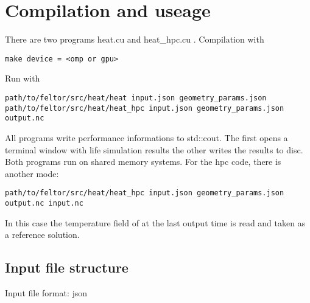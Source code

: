\section{Compilation and useage}
There are two programs heat.cu and heat\_hpc.cu . Compilation with
\begin{verbatim}
make device = <omp or gpu>
\end{verbatim}
Run with
\begin{verbatim}
path/to/feltor/src/heat/heat input.json geometry_params.json
path/to/feltor/src/heat/heat_hpc input.json geometry_params.json output.nc
\end{verbatim}
All programs write performance informations to std::cout.
The first opens a terminal window with life simulation results
the
other writes the results to disc. Both programs run on shared memory
systems.
For the hpc code, there is another mode:
\begin{verbatim}
path/to/feltor/src/heat/heat_hpc input.json geometry_params.json output.nc input.nc
\end{verbatim}
In this case the temperature field of  at the last output
time is read
and taken as a reference solution.

\subsection{Input file structure}
Input file format: json

